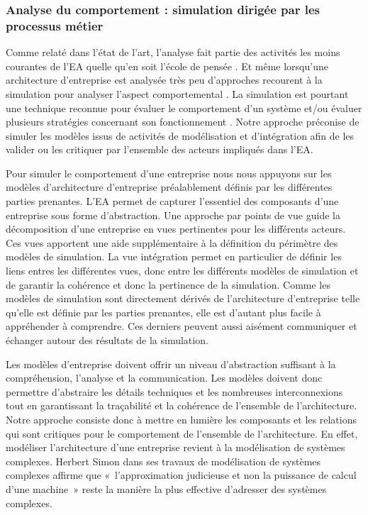         \subsubsection{Analyse du comportement : simulation dirigée par les processus
métier}

Comme relaté dans l'état de l'art, l'analyse fait partie des activités les moins
courantes de l'EA quelle qu'en soit l'école de pensée
\cite{chen2008architectures} \cite{barn2013enterprise}. Et même lorsqu'une
architecture d'entreprise est analysée très peu d'approches recourent à la
simulation pour analyser l'aspect comportemental \cite{glazner2011enterprise}
\cite{manzur2015xarchimate}. La simulation est pourtant une technique reconnue
pour évaluer le comportement d'un système et/ou évaluer plusieurs stratégies
concernant son fonctionnement \cite{shannon1975systems}. Notre approche
préconise de simuler les modèles issus de activités de modélisation et
d'intégration afin de les valider ou les critiquer par l'ensemble des acteurs
impliqués dans l'EA.

Pour simuler le comportement d'une entreprise nous nous appuyons sur les modèles
d'architecture d'entreprise préalablement définis par les différentes parties
prenantes. L'EA permet de capturer l'essentiel des composants d'une
entreprise sous forme d'abstraction. Une approche par points de vue guide la
décomposition d'une entreprise en vues pertinentes pour les différents acteurs.
Ces vues apportent une aide supplémentaire à la définition du périmètre des
modèles de simulation. La vue intégration permet en particulier de définir les
liens entres les différentes vues, donc entre les différents modèles de
simulation et de garantir la cohérence et donc la pertinence de la simulation.
Comme les modèles de simulation sont directement dérivés de l'architecture
d'entreprise telle qu'elle est définie par les parties prenantes, elle est
d'autant plus facile à appréhender à comprendre. Ces derniers peuvent aussi
aisément communiquer et échanger autour des résultats de la simulation.

Les modèles d'entreprise doivent offrir un niveau d'abstraction suffisant à la
compréhension, l'analyse et la communication. Les modèles doivent donc permettre
d'abstraire les détails techniques et les nombreuses interconnexions tout en
garantissant la traçabilité et la cohérence de l'ensemble de l'architecture.
Notre approche consiste donc à mettre en lumière les composants et les
relations qui sont critiques pour le comportement de l'ensemble de
l'architecture. En effet, modéliser l'architecture d'une entreprise revient à la
modélisation de systèmes complexes. Herbert Simon \cite{simon1990prediction}
dans ses travaux de modélisation de systèmes complexes affirme que
«~l'approximation judicieuse et non la puissance de calcul d'une machine~» reste
la manière la plus effective d'adresser des systèmes complexes.

